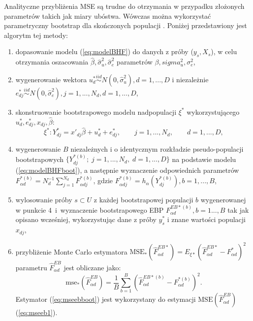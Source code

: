 Analityczne przybliżenia MSE są trudne do otrzymania w przypadku złożonych parametrów takich jak miary ubóstwa. Wówczas można wykorzystać parametryczny bootstrap dla skończonych populacji \citep{gonzales2008}. Poniżej przedstawiony jest algorytm tej metody:

\begin{enumerate}
\item dopasowanie modelu (\ref{eq:modelBHF}) do danych z próby ($y_s, X_s$), w celu otrzymania oszacowania $\hat{\beta}, \hat{\sigma}^2_u, \hat{\sigma}^2_e$ parametrów $\beta, sigma^2_u, \sigma^2_e$,
\item wygenerowanie wektora $u^*_d\stackrel{iid}{\sim}N(0,\hat{\sigma}^2_u), d=1,...,D$ i niezależnie $e^*_{dj}\stackrel{iid}{\sim}N(0,\hat{\sigma}^2_e), j=1,...,N_d, d=1,...,D$,
\item skonstruowanie bootstrapowego modelu nadpopulacji $\xi^*$ wykorzystującego $u^*_d, e^*_{dj}, x_{dj}, \hat{\beta}$:
\begin{equation}
\xi^*:Y^*_{dj}=x'_{dj}\hat{\beta}+u^*_{d}+e^*_{dj},\qquad j=1,...,N_d,\qquad d=1,...,D,
\label{eq:modelBHFboot}
\end{equation}
\item wygenerowanie $B$ niezależnych i o identycznym rozkładzie pseudo-populacji bootstrapowych  $\{Y^{*(b)}_{dj};\;j=1,...,N_d,\;d=1,...,D\}$ na podstawie modelu (\ref{eq:modelBHFboot}), a następnie wyznaczenie odpowiednich parametrów $F^{*(b)}_{\alpha d}=N^{-1}_{d}\sum\limits_{j=1}^{N_d}{F^{*(b)}_{\alpha dj}}$, gdzie $F^{*(b)}_{\alpha dj}=h_{\alpha}(Y^{*(b)}_{dj}),b=1,...,B$,
\item wylosowanie próby $s \subset U$ z każdej bootstrapowej populacji $b$ wygenerowanej w punkcie 4~i~wyznaczenie bootstrapowego EBP $F^{EB*(b)}_{\alpha d},b=1...,B$ tak jak opisano wcześniej, wykorzystując dane z próby $y^*_s$ i znane wartości populacji $x_{dj}$,
\item przybliżenie Monte Carlo estymatora $\text{MSE}_*(\hat{F}^{EB*}_{\alpha d})=E_{\xi*}(\hat{F}^{EB*}_{\alpha d}-F^*_{\alpha d})^2$ parametru $\hat{F}^{EB}_{\alpha d}$ jest obliczane jako:
\begin{equation}
\text{mse}_*(\hat{F}^{EB}_{\alpha d})=\frac{1}{B}\sum\limits_{b=1}^{B}(\hat{F}^{EB*(b)}_{\alpha d}-F^{*(b)}_{\alpha d})^2.
\label{eq:mseebboot}
\end{equation}
Estymator (\ref{eq:mseebboot}) jest wykorzystany do estymacji $\text{MSE}(\hat{F}^{EB}_{\alpha d})$ (\ref{eq:mseeb1}).
\end{enumerate}

